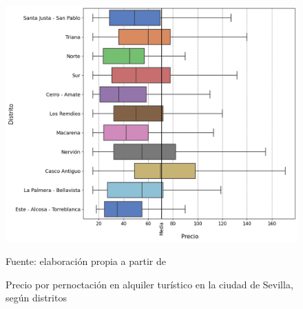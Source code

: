 \documentclass[a4paper,10pt]{article}
\begin{document}
            \begin{figure}[ht]
                \begin{flushleft}
                    \includegraphics*[width = 13cm]{graphics/seville_2018_price.png}
                    \begin{flushright}
                        \footnotesize{Fuente: elaboración propia a partir de \cite[(2)]{datahippo} }
                    \end{flushright}
                    \caption{Precio por pernoctación en alquiler turístico en la ciudad de Sevilla, según distritos}
                \end{flushleft}


\end{figure}
\end{document}
